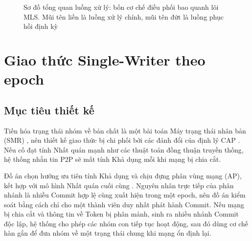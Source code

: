 \documentclass[../DoAn.tex]{subfiles}
\begin{document}
\begin{figure}[htbp]
{
}
\caption{Sơ đồ tổng quan luồng xử lý: bốn cơ chế điều phối bao quanh lõi MLS. Mũi tên liền là luồng xử lý chính, mũi tên đứt là luồng phục hồi định kỳ}
\label{fig:solution_overview}
\end{figure}

\section{Giao thức Single-Writer theo epoch}
\label{sec:single-writer}

\subsection{Mục tiêu thiết kế}

Tiến hóa trạng thái nhóm về bản chất là một bài toán Máy trạng thái nhân bản (SMR) \cite{schneider1990smr}, nên thiết kế giao thức bị chi phối bởi các đánh đổi của định lý CAP \cite{gilbert2002brewers}. Nếu cố đạt tính Nhất quán mạnh như các thuật toán đồng thuận truyền thống, hệ thống nhắn tin P2P sẽ mất tính Khả dụng mỗi khi mạng bị chia cắt. 

Đồ án chọn hướng ưu tiên tính Khả dụng và chịu đựng phân vùng mạng (AP), kết hợp với mô hình Nhất quán cuối cùng \cite{vogels2008eventual}. Nguyên nhân trực tiếp của phân nhánh là nhiều Commit hợp lệ cùng xuất hiện trong một epoch, nên đồ án kiểm soát bằng cách chỉ cho một thành viên duy nhất phát hành Commit. Nếu mạng bị chia cắt và thông tin về Token bị phân mảnh, sinh ra nhiều nhánh Commit độc lập, hệ thống cho phép các nhóm con tiếp tục hoạt động, sau đó dùng cơ chế hàn gắn để đưa nhóm về một trạng thái chung khi mạng ổn định lại.
\end{document}
